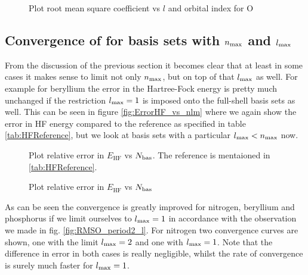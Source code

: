 \begin{figure}
	\centering
	\caption{Plot root mean square coefficient vs $l$ and orbital index for O}
	\label{fig:RMSLF_O}
\end{figure}


\subsection{Convergence of \HF for \CS basis sets with $n_\text{max}$ and $l_\text{max}$}
From the discussion of the previous section
it becomes clear that at least in some cases it makes sense to
limit not only $n_\text{max}$, but on top of that $l_\text{max}$ as well.
For example for beryllium the error
in the Hartree-Fock energy is pretty much unchanged if the
restriction $l_\text{max} = 1$ is imposed onto the full-shell \CS basis sets as well.
This can be seen in figure \vref{fig:ErrorHF_vs_nlm}
where we again show the error in HF energy compared to the reference
as specified in table \vref{tab:HFReference},
but we look at basis sets with a particular $l_\text{max} < n_\text{max}$ now.

\begin{figure}
	\centering
	\caption{Plot relative error in $E_\text{HF}$ vs $N_\text{bas}$.
		The reference is mentaioned in \vref{tab:HFReference}.}
	\label{fig:ErrorHF_vs_nlm}
\end{figure}


\begin{figure}
	\centering
	\caption{Plot relative error in $E_\text{HF}$ vs $N_\text{bas}$}
	\label{fig:ErrorHF_vs_nlm}
\end{figure}

As can be seen the convergence is greatly improved
for nitrogen, beryllium and phosphorus
if we limit ourselves to $l_\text{max} = 1$
in accordance with the observation we made in fig.
\vref{fig:RMSO_period2_l}.
For nitrogen two convergence curves are shown,
one with the limit $l_\text{max} = 2$ and one with $l_\text{max} = 1$.
Note that the difference in \HF error in both cases
is really negligible, whilst the rate of convergence is
surely much faster for $l_\text{max} = 1$.

